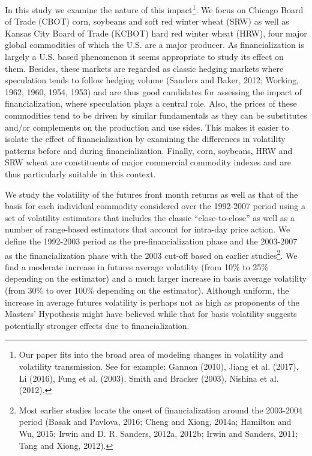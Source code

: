 \documentclass[]{elsarticle} %
\begin{document}
In this study we examine the nature of this impact\footnote{Our paper
  fits into the broad area of modeling changes in volatility and
  volatility transmission. See for example: Gannon (2010), Jiang et al.
  (2017), Li (2016), Fung et al. (2003), Smith and Bracker (2003),
  Nishina et al. (2012).}. We focus on Chicago Board of Trade (CBOT)
corn, soybeans and soft red winter wheat (SRW) as well as Kansas City
Board of Trade (KCBOT) hard red winter wheat (HRW), four major global
commodities of which the U.S. are a major producer. As financialization
is largely a U.S. based phenomenon it seems appropriate to study its
effect on them. Besides, these markets are regarded as classic hedging
markets where speculation tends to follow hedging volume (Sanders and
Baker, 2012; Working, 1962, 1960, 1954, 1953) and are thus good
candidates for assessing the impact of financialization, where
speculation plays a central role. Also, the prices of these commodities
tend to be driven by similar fundamentals as they can be substitutes
and/or complements on the production and use sides. This makes it easier
to isolate the effect of financialization by examining the differences
in volatility patterns before and during financialization. Finally,
corn, soybeans, HRW and SRW wheat are constituents of major commercial
commodity indexes and are thus particularly suitable in this context.

We study the volatility of the futures front month returns as well as
that of the basis for each individual commodity considered over the
1992-2007 period using a set of volatility estimators that includes the
classic ``close-to-close'' as well as a number of range-based estimators
that account for intra-day price action. We define the 1992-2003 period
as the pre-financialization phase and the 2003-2007 as the
financialization phase with the 2003 cut-off based on earlier
studies\footnote{Most earlier studies locate the onset of
  financialization around the 2003-2004 period (Basak and Pavlova, 2016;
  Cheng and Xiong, 2014a; Hamilton and Wu, 2015; Irwin and D. R.
  Sanders, 2012a, 2012b; Irwin and Sanders, 2011; Tang and Xiong, 2012).}.
We find a moderate increase in futures average volatility (from 10\% to
25\% depending on the estimator) and a much larger increase in basis
average volatility (from 30\% to over 100\% depending on the estimator).
Although uniform, the increase in average futures volatility is perhaps
not as high as proponents of the Masters' Hypothesis might have believed
while that for basis volatility suggests potentially stronger effects
due to financialization.
\end{document}
